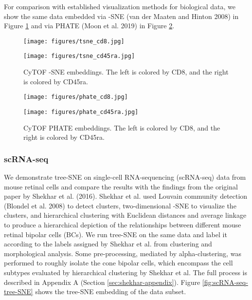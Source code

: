 \documentclass{article}
\begin{document}
For comparison with established visualization methods for biological data, we show the same data embedded via -SNE (van der Maaten and Hinton 2008) in Figure \ref{fig:CyTOF--SNE} and via PHATE (Moon et al. 2019) in Figure \ref{fig:CyTOF-PHATE}. 

\begin{figure}[htp]
    \centering
    \captionsetup{width=.9\linewidth}
    \begin{minipage}[b]{0.4\textwidth}
    \texttt{[image: figures/tsne\_cd8.jpg]}
    \end{minipage}
    \begin{minipage}[b]{0.4\textwidth}
    \texttt{[image: figures/tsne\_cd45ra.jpg]}
    \end{minipage}
    \caption{CyTOF -SNE embeddings. The left is colored by CD8, and the right is colored by CD45ra.}
    \label{fig:CyTOF--SNE}
\end{figure}

\begin{figure}[htp]
    \centering
    \captionsetup{width=.9\linewidth}
    \begin{minipage}[b]{0.4\textwidth}
    \texttt{[image: figures/phate\_cd8.jpg]}
    \end{minipage}
    \begin{minipage}[b]{0.4\textwidth}
    \texttt{[image: figures/phate\_cd45ra.jpg]}
    \end{minipage}
    \caption{CyTOF PHATE embeddings. The left is colored by CD8, and the right is colored by CD45ra.}
    \label{fig:CyTOF-PHATE}
\end{figure}

\subsubsection{scRNA-seq} \label{sec:shekhar}

We demonstrate tree-SNE on single-cell RNA-sequencing (scRNA-seq) data from mouse retinal cells and compare the results with the findings from the original paper by Shekhar et al. (2016). Shekhar et al. used Louvain community detection (Blondel et al. 2008) to detect clusters, two-dimensional -SNE to visualize the clusters, and hierarchical clustering with Euclidean distances and average linkage to produce a hierarchical depiction of the relationships between different mouse retinal bipolar cells (BCs). We run tree-SNE on the same data and label it according to the labels assigned by Shekhar et al. from clustering and morphological analysis. Some pre-processing, mediated by alpha-clustering, was performed to roughly isolate the cone bipolar cells, which encompass the cell subtypes evaluated by hierarchical clustering by Shekhar et al. The full process is described in Appendix A (Section \ref{sec:shekhar-appendix}). Figure \ref{fig:scRNA-seq-tree-SNE} shows the tree-SNE embedding of the data subset. 
\end{document}
